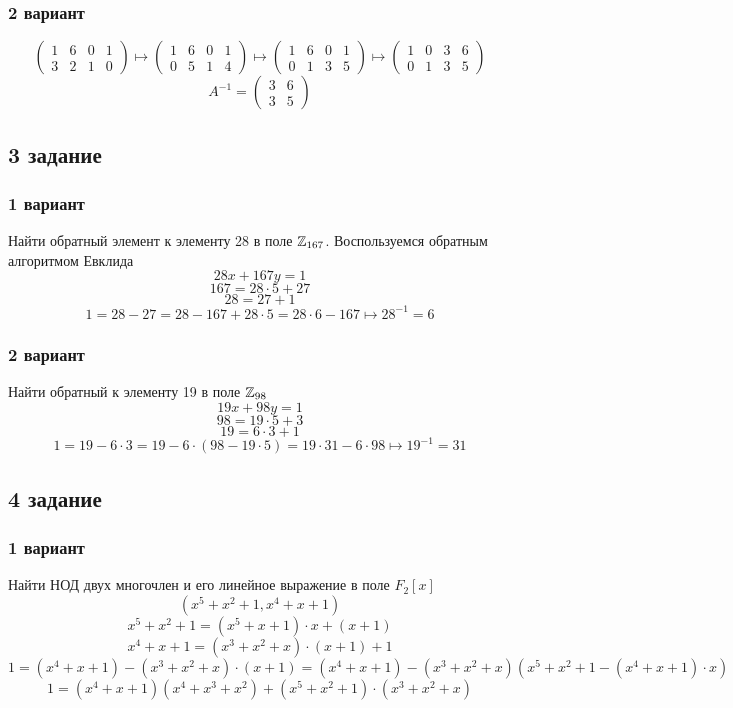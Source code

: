 \subsubsection{2 вариант}
\[ \left( \begin{array}{cc|cc}
		1 & 6 &0 & 1\\
		3 & 2 & 1 & 0 
\end{array}\right) \longmapsto  \left( \begin{array}{cc|cc}
		1 & 6 &0 & 1\\
		0 & 5 & 1 & 4 
\end{array}\right)\longmapsto  \left( \begin{array}{cc|cc}
		1 & 6 &0 & 1\\
		0 & 1 & 3 & 5 
\end{array}\right)\longmapsto   \left( \begin{array}{cc|cc}
		1 & 0 &3 & 6\\
		0 & 1 & 3 & 5 
\end{array}\right)
\]
$$A^{-1} = \begin{pmatrix}3 & 6 \\3 & 5\end{pmatrix}$$
\subsection{3 задание }
\subsubsection{1 вариант}
Найти обратный элемент к элементу 28 в поле $\mathbb{Z}_{167}$. Воспользуемся обратным алгоритмом Евклида
$$28x+167y = 1$$
$$167 = 28\cdot5 + 27$$
$$28 = 27+1$$
$$1 = 28-27 = 28- 167+28\cdot5 = 28\cdot6 -167\longmapsto 28^{-1} = 6$$
\subsubsection{2 вариант}
Найти обратный к элементу 19 в поле $\mathbb{Z}_{98}$
$$19x+98y = 1$$
$$98 = 19\cdot5 + 3$$
$$19 = 6\cdot3+1$$
$$1 = 19-6\cdot3 = 19-6\cdot\left(98-19\cdot5\right) = 19\cdot 31 -6\cdot98\longmapsto 19^{-1} = 31$$
\subsection{4 задание}
\subsubsection{1 вариант}
Найти НОД двух многочлен и его линейное выражение в поле $F_2[x]$\\
$$\left(x^5+x^2+1, x^4+x+1\right)$$
$$x^5+x^2+1 = \left(x^5+x+1\right)\cdot x + \left(x+1\right)$$
$$x^4+x+1 = \left(x^3+x^2+x\right)\cdot\left(x+1\right)+1$$
$$1 = \left(x^4+x+1\right)- \left(x^3+x^2+x\right)\cdot\left(x+1\right) = \left(x^4+x+1\right)-\left(x^3+x^2+x\right)\left(x^5+x^2+1-(x^4+x+1)\cdot x\right)$$
$$1 = \left(x^4+x+1\right)\left(x^4+x^3+x^2\right)+\left(x^5+x^2+1\right)\cdot\left(x^3+x^2+x\right)$$
